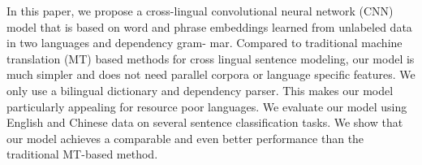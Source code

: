 In this paper, we propose a cross-lingual convolutional neural network (CNN) model that is based on word and phrase embeddings learned from unlabeled data in two languages and dependency gram- mar. Compared to traditional machine translation (MT) based methods for cross lingual sentence modeling, our model is much simpler and does not need parallel corpora or language specific features. We only use a bilingual dictionary and dependency parser. This makes our model particularly appealing for resource poor languages. We evaluate our model using English and Chinese data on several sentence classification tasks. We show that our model achieves a comparable and even better performance than the traditional MT-based method.
